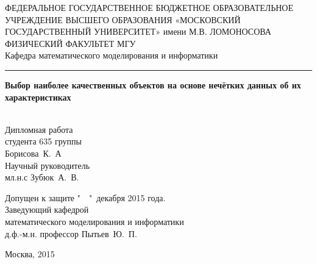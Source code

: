 
\begin{titlepage}

\begin{center}
\vfill

{\small ФЕДЕРАЛЬНОЕ ГОСУДАРСТВЕННОЕ БЮДЖЕТНОЕ ОБРАЗОВАТЕЛЬНОЕ 
УЧРЕЖДЕНИЕ ВЫСШЕГО ОБРАЗОВАНИЯ 
«МОСКОВСКИЙ ГОСУДАРСТВЕННЫЙ УНИВЕРСИТЕТ» имени М.В. ЛОМОНОСОВА
\ \\[1ex]
ФИЗИЧЕСКИЙ ФАКУЛЬТЕТ МГУ }
\ \\[0.8ex]
Кафедра математического моделирования и информатики
\ \\[1.8ex] 
\hrule 

\vfill

{\large\bf Выбор наиболее качественных объектов на основе нечётких данных об их характеристиках \\}
\ \\[2ex]
\begin{flushright}
\begin{minipage}{0.35\textwidth}
Дипломная работа  \\ студента 635 группы \\ Борисова~К.~А
\\[1ex]
Научный руководитель \\ мл.н.с Зубюк~А.~В.
\end{minipage}
\end{flushright}

\vfill
\end{center}
\hspace{3em}\begin{minipage}{0.65\textwidth}
Допущен к защите "\ \  "\  декабря 2015 года.
\\[1ex]
Заведующий кафедрой \\
математического моделирования и информатики \\ 
д.ф.-м.н. профессор Пытьев~Ю.~П.
\end{minipage}

\vfill
\begin{center}
Москва, 2015
\end{center}

\end{titlepage}